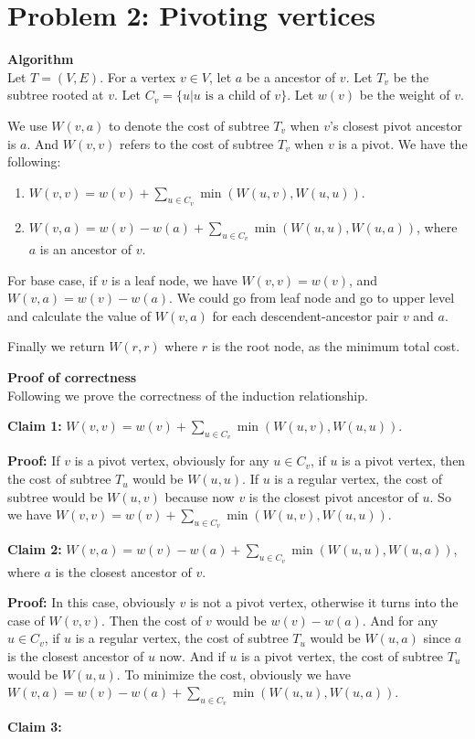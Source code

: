 \documentclass{article}
\newcommand{\Proof}{\vspace{0.3cm} \noindent\textbf{Proof of correctness} \vspace{0.2cm} \\}
\newcommand{\Algorithm}{\textbf{Algorithm} \vspace{0.2cm}\\}
\begin{document}
\section*{Problem 2: Pivoting vertices}
\Algorithm
Let $T = (V, E)$. For a vertex $v \in V$, let $a$ be a ancestor of $v$. Let $T_v$ be the subtree
rooted at $v$. Let $C_v = \{u | u \text{ is a child of } v\}$. Let $w(v)$ be the weight of $v$.

We use $W(v, a)$ to denote the cost of subtree $T_v$ when $v$'s closest pivot ancestor is
$a$. And $W(v, v)$ refers to the cost of subtree $T_v$ when $v$ is a pivot.   
We have the following:
\begin{enumerate}
  \item $W(v, v) = w(v) + \sum_{u \in C_v} \min(W(u, v), W(u, u))$. 
  \item $W(v, a) = w(v) - w(a) + \sum_{u \in C_v} \min( W(u, u), W(u, a))$, where $a$ is an ancestor of
    $v$.
\end{enumerate}

For base case, if $v$ is a leaf node, we have $W(v, v) = w(v)$, and $W(v, a) = w(v) - w(a)$. We
could go from leaf node and go to upper level and calculate the value of $W(v, a)$ for each
descendent-ancestor pair $v$ and $a$. 

Finally we return $W(r, r)$ where $r$ is the root node, as the minimum total cost.

\Proof
Following we prove the correctness of the induction relationship. 

\textbf{Claim 1:}
$W(v, v) = w(v) + \sum_{u \in C_v} \min(W(u, v), W(u, u))$. 

\textbf{Proof:}
If $v$ is a pivot vertex, obviously for any $u \in C_v$, if $u$ is a pivot vertex,
then the cost of subtree $T_u$ would be $W(u, u)$. If $u$ is a regular vertex, the cost of subtree
would be $W(u, v)$ because now $v$ is the closest pivot ancestor of $u$. So we have 
$W(v, v) = w(v) + \sum_{u \in C_v} \min(W(u, v), W(u, u))$. 

\textbf{Claim 2:}
 $W(v, a) = w(v) - w(a) + \sum_{u \in C_v} \min( W(u, u), W(u, a))$, where $a$ is the closest ancestor of
 $v$.

\textbf{Proof:}
In this case, obviously $v$ is not a pivot vertex, otherwise it turns into the case of $W(v, v)$.
Then the cost of $v$ would be $w(v) - w(a)$. And for any $u \in C_v$, if $u$ is a regular vertex,
the cost of subtree $T_u$ would be $W(u, a)$ since $a$ is the closest ancestor of $u$ now. And if 
$u$ is a pivot vertex, the cost of subtree $T_u$ would be $W(u, u)$. To minimize the cost, obviously we have  
$W(v, a) = w(v) - w(a) + \sum_{u \in C_v} \min( W(u, u), W(u, a))$.

\textbf{Claim 3:}
\end{document}
